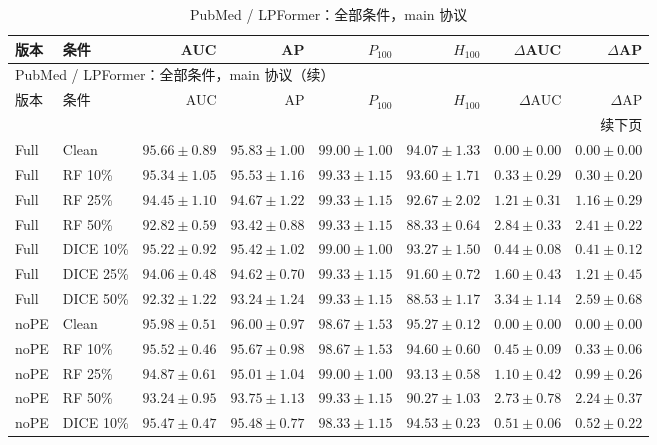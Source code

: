 {\footnotesize
\setlength{\tabcolsep}{3.2pt}
\renewcommand{\arraystretch}{1.10}
\begin{longtable}{llrrrrrr}
\caption{PubMed / LPFormer：全部条件，main 协议}\\
\toprule
版本 & 条件 & AUC & AP & $P_{100}$ & $H_{100}$ & $\Delta$AUC & $\Delta$AP \\
\midrule
\endfirsthead
\multicolumn{8}{l}{PubMed / LPFormer：全部条件，main 协议（续）}\\
\toprule
版本 & 条件 & AUC & AP & $P_{100}$ & $H_{100}$ & $\Delta$AUC & $\Delta$AP \\
\midrule
\endhead
\midrule\multicolumn{8}{r}{续下页}\\
\endfoot
\bottomrule
\endlastfoot
Full & Clean & $95.66\pm0.89$ & $95.83\pm1.00$ & $99.00\pm1.00$ & $94.07\pm1.33$ & $0.00\pm0.00$ & $0.00\pm0.00$ \\
Full & RF 10\% & $95.34\pm1.05$ & $95.53\pm1.16$ & $99.33\pm1.15$ & $93.60\pm1.71$ & $0.33\pm0.29$ & $0.30\pm0.20$ \\
Full & RF 25\% & $94.45\pm1.10$ & $94.67\pm1.22$ & $99.33\pm1.15$ & $92.67\pm2.02$ & $1.21\pm0.31$ & $1.16\pm0.29$ \\
Full & RF 50\% & $92.82\pm0.59$ & $93.42\pm0.88$ & $99.33\pm1.15$ & $88.33\pm0.64$ & $2.84\pm0.33$ & $2.41\pm0.22$ \\
Full & DICE 10\% & $95.22\pm0.92$ & $95.42\pm1.02$ & $99.00\pm1.00$ & $93.27\pm1.50$ & $0.44\pm0.08$ & $0.41\pm0.12$ \\
Full & DICE 25\% & $94.06\pm0.48$ & $94.62\pm0.70$ & $99.33\pm1.15$ & $91.60\pm0.72$ & $1.60\pm0.43$ & $1.21\pm0.45$ \\
Full & DICE 50\% & $92.32\pm1.22$ & $93.24\pm1.24$ & $99.33\pm1.15$ & $88.53\pm1.17$ & $3.34\pm1.14$ & $2.59\pm0.68$ \\
noPE & Clean & $95.98\pm0.51$ & $96.00\pm0.97$ & $98.67\pm1.53$ & $95.27\pm0.12$ & $0.00\pm0.00$ & $0.00\pm0.00$ \\
noPE & RF 10\% & $95.52\pm0.46$ & $95.67\pm0.98$ & $98.67\pm1.53$ & $94.60\pm0.60$ & $0.45\pm0.09$ & $0.33\pm0.06$ \\
noPE & RF 25\% & $94.87\pm0.61$ & $95.01\pm1.04$ & $99.00\pm1.00$ & $93.13\pm0.58$ & $1.10\pm0.42$ & $0.99\pm0.26$ \\
noPE & RF 50\% & $93.24\pm0.95$ & $93.75\pm1.13$ & $99.33\pm1.15$ & $90.27\pm1.03$ & $2.73\pm0.78$ & $2.24\pm0.37$ \\
noPE & DICE 10\% & $95.47\pm0.47$ & $95.48\pm0.77$ & $98.33\pm1.15$ & $94.53\pm0.23$ & $0.51\pm0.06$ & $0.52\pm0.22$ \\

\end{longtable}}
